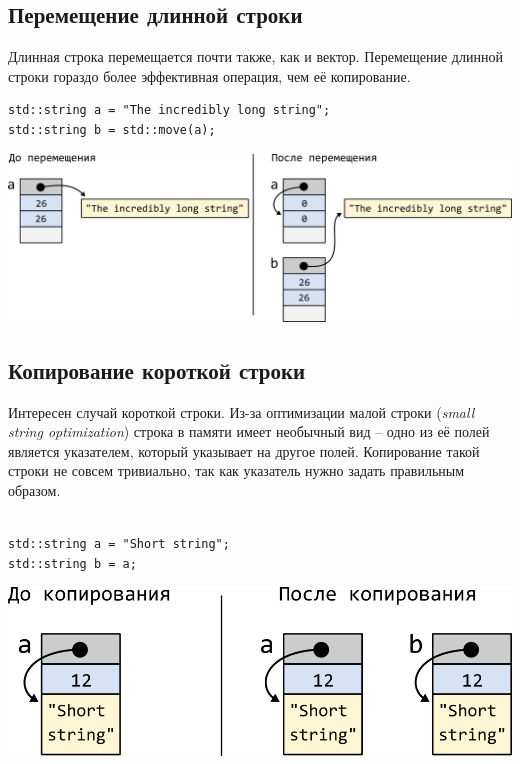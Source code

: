 \documentclass{article}
\begin{document}
\subsection*{Перемещение длинной строки}
Длинная строка перемещается почти также, как и вектор. Перемещение длинной строки гораздо более эффективная операция, чем её копирование.
\begin{lstlisting}
std::string a = "The incredibly long string";
std::string b = std::move(a);
\end{lstlisting}
\begin{center}
\includegraphics[scale=1]{../images/move_long_string.png}
\end{center}


\subsection*{Копирование короткой строки}
Интересен случай короткой строки. Из-за оптимизации малой строки (\textit{small string optimization}) строка в памяти имеет необычный вид -- одно из её полей является указателем, который указывает на другое полей. Копирование такой строки не совсем тривиально, так как указатель нужно задать правильным образом.\\

\quad\\
\begin{minipage}{0.4\textwidth}\noindent
\begin{lstlisting}
std::string a = "Short string";
std::string b = a;
\end{lstlisting}
\end{minipage}
\begin{minipage}{0.4\textwidth}
\includegraphics[scale=1]{../images/copy_short_string.png}
\end{minipage}
\end{document}
